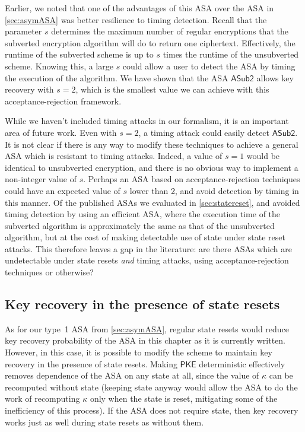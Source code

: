 Earlier, we noted that one of the advantages of this ASA over the ASA in \autoref{sec:asymASA} was better resilience to timing detection. Recall that the parameter $s$ determines the maximum number of regular encryptions that the subverted encryption algorithm will do to return one ciphertext. Effectively, the runtime of the subverted scheme is up to $s$ times the runtime of the unsubverted scheme. Knowing this, a large $s$ could allow a user to detect the ASA by timing the execution of the algorithm. We have shown that the ASA $\mathsf{ASub2}$ allows key recovery with $s=2$, which is the smallest value we can achieve with this acceptance-rejection framework.

While we haven't included timing attacks in our formalism, it is an important area of future work. Even with $s=2$, a timing attack could easily detect $\mathsf{ASub2}$. It is not clear if there is any way to modify these techniques to achieve a general ASA which is resistant to timing attacks. Indeed, a value of $s=1$ would be identical to unsubverted encryption, and there is no obvious way to implement a non-integer value of $s$. Perhaps an ASA based on acceptance-rejection techniques could have an expected value of $s$ lower than 2, and avoid detection by timing in this manner. Of the published ASAs we evaluated in \autoref{sec:statereset}, \cite{BSKC2019} and \cite{AC:CheHuaYun20} avoided timing detection by using an efficient ASA, where the execution time of the subverted algorithm is approximately the same as that of the unsubverted algorithm, but at the cost of making detectable use of state under state reset attacks. This therefore leaves a gap in the literature: are there ASAs which are undetectable under state resets \emph{and} timing attacks, using acceptance-rejection techniques or otherwise?

\subsection{Key recovery in the presence of state resets}
As for our type~1 ASA from \autoref{sec:asymASA}, regular state resets would reduce key recovery probability of the ASA in this chapter as it is currently written. However, in this case, it is possible to modify the scheme to maintain key recovery in the presence of state resets. Making $\textsf{PKE}$ deterministic effectively removes dependence of the ASA on any state at all, since the value of $\kappa$ can be recomputed without state (keeping state anyway would allow the ASA to do the work of recomputing $\kappa$ only when the state is reset, mitigating some of the inefficiency of this process). If the ASA does not require state, then key recovery works just as well during state resets as without them.

